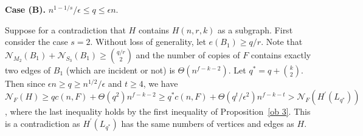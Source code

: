 \documentclass[10pt]{article}
\begin{document}
{\bf Case (B).} $ n^{1-1/s} /\epsilon  \leq q\leq \epsilon n$.

\medskip

Suppose for a contradiction that $H$ contains $H(n,r,k)$ as a subgraph.
First consider the case $s=2$.
Without loss of generality, let $e(B_1)\geq q/r$.
Note that $\mathcal{N}_{M_2}(B_1)+\mathcal{N}_{S_3}(B_1)\geq{q/r \choose 2}$ and the number of copies of $F$ contains exactly two edges of $B_1$ (which are incident or not) is $\Theta(n^{f-k-2})$.
Let $q^\ast=q+\binom{k}{2}$.
Then since $\epsilon n\geq q\geq n^{1/2}/\epsilon$ and $t\geq 4$, we have
$\mathcal{N}_F(H)\geq q c(n,F)+\Theta(q^2)n^{f-k-2}\geq q^\ast c(n,F)+\Theta(q^t/\epsilon^2)n^{f-k-t}>\mathcal{N}_F(H^\prime(L_{q^\ast}))$, where the last inequality holds by the first inequality of Proposition~\ref{ob 3}.
This is a contradiction as $H^\prime(L_{q^\ast})$ has the same numbers of vertices and edges as $H$.
\end{document}
